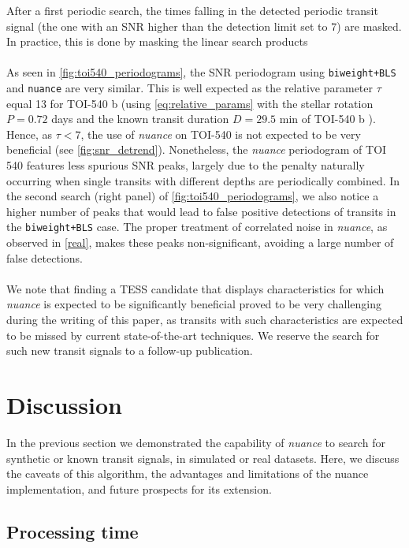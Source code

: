 \documentclass{aastex631}
\newcommand{\nuancemethod}{\textit{nuance}}
\newcommand{\nuance}{\nuancemethod{}}
\newcommand{\nuancecode}{\textsf{nuance}}
\begin{document}
After a first periodic search, the times falling in the detected periodic transit signal (the one with an SNR higher than the detection limit set to 7) are masked. In practice, this is done by masking the linear search products \\\\
As seen in \autoref{fig:toi540_periodograms}, the SNR periodogram using \texttt{biweight+BLS} and \texttt{nuance} are very similar. This is well expected as the relative parameter $\tau$ equal 13 for TOI-540 b (using \autoref{eq:relative_params} with the stellar rotation $P=0.72$ days and the known transit duration $D=29.5$ min of TOI-540 b \citep{TOI540}). Hence, as $\tau < 7$, the use of \nuance{} on TOI-540 is not expected to be very beneficial (see \autoref{fig:snr_detrend}). Nonetheless, the \nuance{} periodogram of TOI 540 features less spurious SNR peaks, largely due to the penalty naturally occurring when single transits with different depths are periodically combined. In the second search (right panel) of \autoref{fig:toi540_periodograms}, we also notice a higher number of peaks that would lead to false positive detections of transits in the \texttt{biweight+BLS} case. The proper treatment of correlated noise in \nuance{}, as observed in \autoref{real}, makes these peaks non-significant, avoiding a large number of false detections.\\\\
We note that finding a TESS candidate that displays characteristics for which \nuance{} is expected to be significantly beneficial proved to be very challenging during the writing of this paper, as transits with such characteristics are expected to be missed by current state-of-the-art techniques. We reserve the search for such new transit signals to a follow-up publication.

\section{Discussion}\label{discussion}

In the previous section we demonstrated the capability of \nuance{} to search for synthetic or known transit signals, in simulated or real datasets. Here, we discuss the caveats of this algorithm, the advantages and limitations of the \nuancecode{} implementation, and future prospects for its extension.

\subsection{Processing time}
\end{document}
